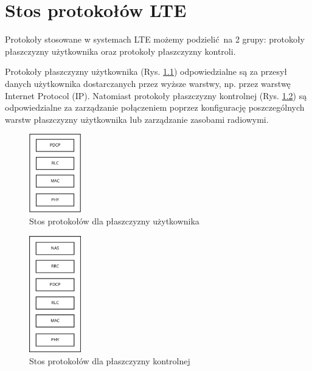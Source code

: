\chapter{Stos protokołów LTE}
\label{cha:protokoly}

Protokoły stosowane w systemach LTE możemy podzielić na 2 grupy: protokoły płaszczyzny użytkownika oraz protokoły płaszczyzny kontroli.

Protokoły płaszczyzny użytkownika (Rys. \ref{fig:userPlaneProtocols}) odpowiedzialne są za przesył danych użytkownika dostarczanych przez wyższe warstwy, np. przez warstwę Internet Protocol (IP). Natomiast protokoły płaszczyzny kontrolnej (Rys. \ref{fig:controlPlaneProtocols}) są odpowiedzialne za zarządzanie połączeniem poprzez konfigurację poszczególnych warstw płaszczyzny użytkownika lub zarządzanie zasobami radiowymi.

\begin{figure}
	\centering
		\includegraphics[width=0.2\textwidth]{user-plane-protocols.jpg}
	\caption{Stos protokołów dla płaszczyzny użytkownika}
	\label{fig:userPlaneProtocols}
\end{figure}


\begin{figure}
	\centering
		\includegraphics[width=0.2\textwidth]{control-plane-protocols.jpg}
	\caption{Stos protokołów dla płaszczyzny kontrolnej}
	\label{fig:controlPlaneProtocols}
\end{figure}


